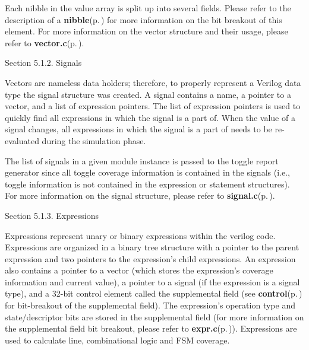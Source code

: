 \begin{Desc}
\item[]Each nibble in the value array is split up into several fields. Please refer to the description of a {\bf nibble}{\rm (p.\,\pageref{defines_8h_a154})} for more information on the bit breakout of this element. For more information on the vector structure and their usage, please refer to {\bf vector.c}{\rm (p.\,\pageref{vector_8c})}.\end{Desc}
\begin{Desc}
\item[Section 5.1.2. Signals]\end{Desc}
\begin{Desc}
\item[]Vectors are nameless data holders; therefore, to properly represent a Verilog data type the signal structure was created. A signal contains a name, a pointer to a vector, and a list of expression pointers. The list of expression pointers is used to quickly find all expressions in which the signal is a part of. When the value of a signal changes, all expressions in which the signal is a part of needs to be re-evaluated during the simulation phase.\end{Desc}
\begin{Desc}
\item[]The list of signals in a given module instance is passed to the toggle report generator since all toggle coverage information is contained in the signals (i.e., toggle information is not contained in the expression or statement structures). For more information on the signal structure, please refer to {\bf signal.c}{\rm (p.\,\pageref{signal_8c})}.\end{Desc}
\begin{Desc}
\item[Section 5.1.3. Expressions]\end{Desc}
\begin{Desc}
\item[]Expressions represent unary or binary expressions within the verilog code. Expressions are organized in a binary tree structure with a pointer to the parent expression and two pointers to the expression's child expressions. An expression also contains a pointer to a vector (which stores the expression's coverage information and current value), a pointer to a signal (if the expression is a signal type), and a 32-bit control element called the supplemental field (see {\bf control}{\rm (p.\,\pageref{defines_8h_a155})} for bit-breakout of the supplemental field). The expression's operation type and state/descriptor bits are stored in the supplemental field (for more information on the supplemental field bit breakout, please refer to {\bf expr.c}{\rm (p.\,\pageref{expr_8c})}). Expressions are used to calculate line, combinational logic and FSM coverage.\end{Desc}

